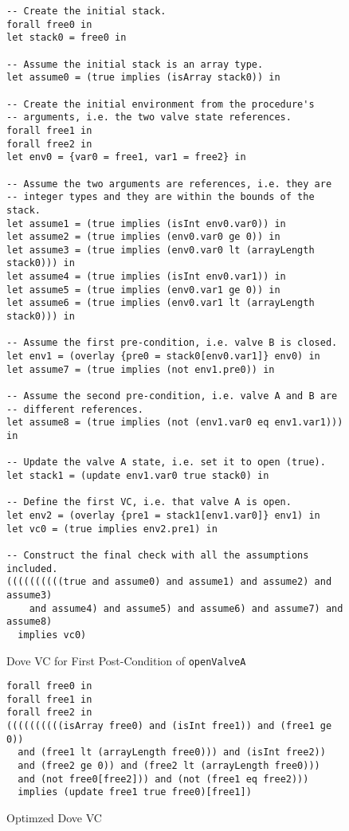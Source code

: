 \documentclass{article}
\begin{document}
\begin{figure}
  \caption{Dove VC for First Post-Condition of \texttt{openValveA}}
  \label{fig:openValveAVC1}
  \begin{lstlisting}
-- Create the initial stack.
forall free0 in
let stack0 = free0 in

-- Assume the initial stack is an array type.
let assume0 = (true implies (isArray stack0)) in

-- Create the initial environment from the procedure's
-- arguments, i.e. the two valve state references.
forall free1 in
forall free2 in
let env0 = {var0 = free1, var1 = free2} in

-- Assume the two arguments are references, i.e. they are
-- integer types and they are within the bounds of the stack.
let assume1 = (true implies (isInt env0.var0)) in
let assume2 = (true implies (env0.var0 ge 0)) in
let assume3 = (true implies (env0.var0 lt (arrayLength stack0))) in
let assume4 = (true implies (isInt env0.var1)) in
let assume5 = (true implies (env0.var1 ge 0)) in
let assume6 = (true implies (env0.var1 lt (arrayLength stack0))) in

-- Assume the first pre-condition, i.e. valve B is closed.
let env1 = (overlay {pre0 = stack0[env0.var1]} env0) in
let assume7 = (true implies (not env1.pre0)) in

-- Assume the second pre-condition, i.e. valve A and B are
-- different references.
let assume8 = (true implies (not (env1.var0 eq env1.var1))) in

-- Update the valve A state, i.e. set it to open (true).
let stack1 = (update env1.var0 true stack0) in

-- Define the first VC, i.e. that valve A is open.
let env2 = (overlay {pre1 = stack1[env1.var0]} env1) in
let vc0 = (true implies env2.pre1) in

-- Construct the final check with all the assumptions included.
((((((((((true and assume0) and assume1) and assume2) and assume3)
    and assume4) and assume5) and assume6) and assume7) and assume8)
  implies vc0)
  \end{lstlisting}
\end{figure}


\begin{figure}
  \caption{Optimzed Dove VC}
  \label{fig:openValveAVC1Opt}
  \begin{lstlisting}
forall free0 in
forall free1 in
forall free2 in
((((((((((isArray free0) and (isInt free1)) and (free1 ge 0))
  and (free1 lt (arrayLength free0))) and (isInt free2))
  and (free2 ge 0)) and (free2 lt (arrayLength free0)))
  and (not free0[free2])) and (not (free1 eq free2)))
  implies (update free1 true free0)[free1])
  \end{lstlisting}
\end{figure}
\end{document}
